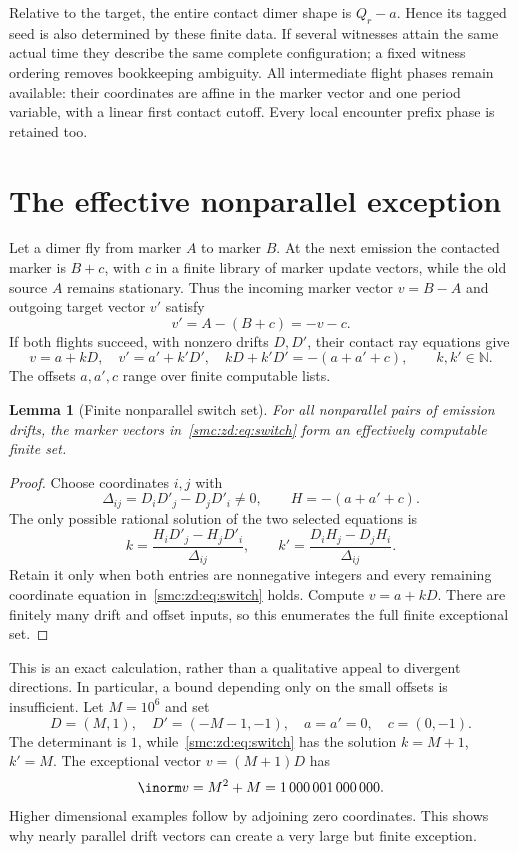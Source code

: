 \documentclass[11pt,letterpaper]{article}
\numberwithin{equation}{section}
\newtheorem{lemma}[theorem]{Lemma}
\theoremstyle{definition}
\theoremstyle{remark}
\newcommand{\NN}{\mathbb N}
\begin{document}
Relative to the target, the entire contact dimer shape is $Q_r-a$. Hence its tagged seed is also determined by these finite data. If several witnesses attain the same actual time they describe the same complete configuration; a fixed witness ordering removes bookkeeping ambiguity. All intermediate flight phases remain available: their coordinates are affine in the marker vector and one period variable, with a linear first contact cutoff. Every local encounter prefix phase is retained too.

\section{The effective nonparallel exception}\label{smc:zd:sec:exception}
Let a dimer fly from marker $A$ to marker $B$. At the next emission the contacted marker is $B+c$, with $c$ in a finite library of marker update vectors, while the old source $A$ remains stationary. Thus the incoming marker vector $v=B-A$ and outgoing target vector $v'$ satisfy
\[
 v'=A-(B+c)=-v-c.
\]
If both flights succeed, with nonzero drifts $D,D'$, their contact ray equations give
\begin{equation}\label{smc:zd:eq:switch}
 v=a+kD,\quad v'=a'+k'D',\quad
 kD+k'D'=-(a+a'+c),\qquad k,k'\in\NN.
\end{equation}
The offsets $a,a',c$ range over finite computable lists.

\begin{lemma}[Finite nonparallel switch set]\label{smc:zd:lem:exception}
For all nonparallel pairs of emission drifts, the marker vectors in~\eqref{smc:zd:eq:switch} form an effectively computable finite set.
\end{lemma}
\begin{proof}
Choose coordinates $i,j$ with
\[
 \Delta_{ij}=D_iD'_j-D_jD'_i\ne0,
 \qquad H=-(a+a'+c).
\]
The only possible rational solution of the two selected equations is
\begin{equation}\label{smc:zd:eq:cramer}
 k=\frac{H_iD'_j-H_jD'_i}{\Delta_{ij}},\qquad
 k'=\frac{D_iH_j-D_jH_i}{\Delta_{ij}}.
\end{equation}
Retain it only when both entries are nonnegative integers and every remaining coordinate equation in~\eqref{smc:zd:eq:switch} holds. Compute $v=a+kD$. There are finitely many drift and offset inputs, so this enumerates the full finite exceptional set.
\end{proof}

This is an exact calculation, rather than a qualitative appeal to divergent directions. In particular, a bound depending only on the small offsets is insufficient. Let $M=10^6$ and set
\[
 D=(M,1),\quad D'=(-M-1,-1),\quad a=a'=0,\quad c=(0,-1).
\]
The determinant is $1$, while~\eqref{smc:zd:eq:switch} has the solution $k=M+1$, $k'=M$. The exceptional vector $v=(M+1)D$ has
\[
 \inorm v=M^2+M=1\,000\,001\,000\,000.
\]
Higher dimensional examples follow by adjoining zero coordinates. This shows why nearly parallel drift vectors can create a very large but finite exception.
\end{document}
